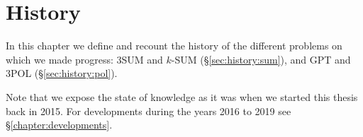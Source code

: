 \chapter{History}

In this chapter we define and recount the history of the different problems on
which we made progress:
%
3SUM and \(k\)-SUM (\S\ref{sec:history:sum}),
and
GPT and 3POL (\S\ref{sec:history:pol}).

Note that we expose the state of knowledge as it was when we started this
thesis back in 2015. For developments during the years 2016 to 2019 see
\S\ref{chapter:developments}.



